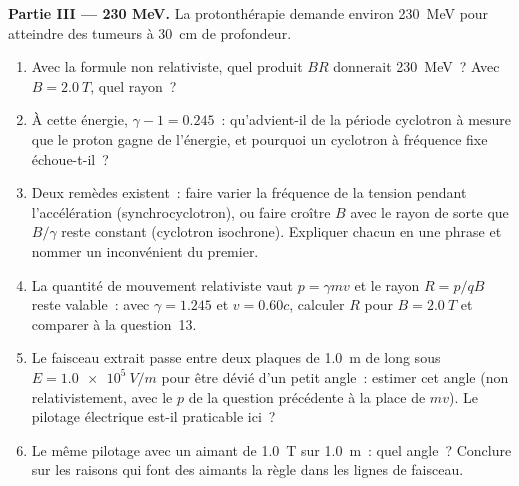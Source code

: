 \begin{problem}
\medskip
\noindent\textbf{Partie III --- 230 MeV.}
La protonthérapie demande environ \qty{230}{MeV} pour atteindre des
tumeurs à \qty{30}{cm} de profondeur.
\begin{enumerate}[resume]
  \item Avec la formule non relativiste, quel produit $BR$ donnerait
        \qty{230}{MeV}~? Avec $B = \qty{2.0}{T}$, quel rayon~?
  \item À cette énergie, $\gamma - 1 = 0.245$~: qu'advient-il de la
        période cyclotron à mesure que le proton gagne de l'énergie, et
        pourquoi un cyclotron à fréquence fixe échoue-t-il~?
  \item Deux remèdes existent~: faire varier la fréquence de la tension
        pendant l'accélération (synchrocyclotron), ou faire croître $B$
        avec le rayon de sorte que $B/\gamma$ reste constant (cyclotron
        isochrone). Expliquer chacun en une phrase et nommer un
        inconvénient du premier.
  \item La quantité de mouvement relativiste vaut $p = \gamma mv$ et le
        rayon $R =
        p/qB$ reste valable~: avec $\gamma = 1.245$ et $v = 0.60c$,
        calculer $R$ pour $B = \qty{2.0}{T}$ et comparer à la question~13.
  \item Le faisceau extrait passe entre deux plaques de \qty{1.0}{m} de
        long sous $E = \qty{1.0e5}{V/m}$ pour être dévié d'un petit
        angle~: estimer cet angle (non relativistement, avec le $p$ de la
        question précédente à la place de $mv$). Le pilotage électrique
        est-il praticable ici~?
  \item Le même pilotage avec un aimant de \qty{1.0}{T} sur \qty{1.0}{m}~:
        quel angle~? Conclure sur les raisons qui font des aimants la
        règle dans les lignes de faisceau.
\end{enumerate}


\end{problem}

